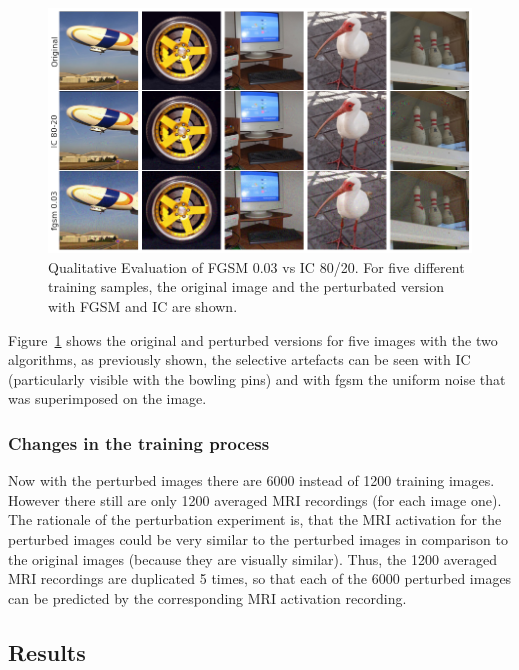 \begin{figure}[ht]
    \centering
    \includegraphics[width=1\textwidth]{plots/advpert_validation_chosen_qual.png}
    \caption[Qualitative Evaluation of FGSM 0.03 vs IC 80/20]{Qualitative Evaluation of FGSM 0.03 vs IC 80/20. For five different training samples, the original image and the perturbated version with FGSM and IC are shown.}\label{fig:advpert_validation_chosen_qual}
\end{figure}

Figure~\ref{fig:advpert_validation_chosen_qual} shows the original and perturbed versions for five images with the two algorithms, as previously shown, the selective artefacts can be seen with IC (particularly visible with the bowling pins) and with fgsm the uniform noise that was superimposed on the image. 

\subsubsection{Changes in the training process}

Now with the perturbed images there are 6000 instead of 1200 training images. However there still are only 1200 averaged MRI recordings (for each image one). The rationale of the perturbation experiment is, that the MRI activation for the perturbed images could be very similar to the perturbed images in comparison to the original images (because they are visually similar). Thus, the 1200 averaged MRI recordings are duplicated 5 times, so that each of the 6000 perturbed images can be predicted by the corresponding MRI activation recording.


\subsection{Results}

